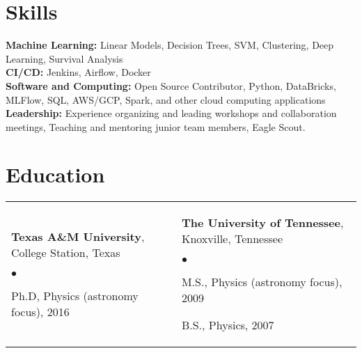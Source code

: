 \documentclass[margin,line, 11pt]{res}
\newenvironment{list2}{
  \begin{list}{$\bullet$}{%
      \setlength{\itemsep}{0in}
      \setlength{\parsep}{0in} \setlength{\parskip}{0in}
      \setlength{\topsep}{0in} \setlength{\partopsep}{0in}
      \setlength{\leftmargin}{0.2in}}}{\end{list}}
\begin{document}
\begin{resume}

\section{Skills}
\textbf{Machine Learning:} Linear Models, Decision Trees, SVM, Clustering, Deep Learning, Survival Analysis\\
\textbf{CI/CD:} Jenkins, Airflow, Docker\\
\textbf{Software and Computing:} Open Source Contributor, Python, DataBricks, MLFlow, SQL, AWS/GCP, Spark, and other cloud computing applications \\
\textbf{Leadership:} Experience organizing and leading workshops and collaboration meetings, Teaching and mentoring junior team members, Eagle Scout. \\
\vspace*{-7mm}

\section{Education}
\begin{tabular}{@{}p{3in}p{3in}}
  \textbf{Texas A\&M University}, College Station, Texas
  \begin{list2}
  	\item Ph.D, Physics (astronomy focus), 2016
  \end{list2} &
  \textbf{The University of Tennessee}, Knoxville, Tennessee
  \begin{list2}
  	\item M.S., Physics (astronomy focus), 2009
  	\item B.S., Physics, 2007
  \end{list2} \\
\end{tabular}
\vspace*{-4mm}

\end{resume}
\end{document}
